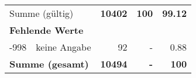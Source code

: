 \begin{longtable}{lXrrr}
     \midrule
     \multicolumn{2}{l}{Summe (gültig)} &
       \textbf{\num{10402}} &
     \textbf{100} &
       \textbf{\num[round-mode=places,round-precision=2]{99,12}} \\
     \multicolumn{5}{l}{\textbf{Fehlende Werte}}\\
       -998 &
       keine Angabe &
         \num{92} &
        - &
         \num[round-mode=places,round-precision=2]{0,88} \\
     \midrule
     \multicolumn{2}{l}{\textbf{Summe (gesamt)}} &
          \textbf{\num{10494}} &
        \textbf{-} &
        \textbf{100} \\
     \bottomrule
     \end{longtable}
     
